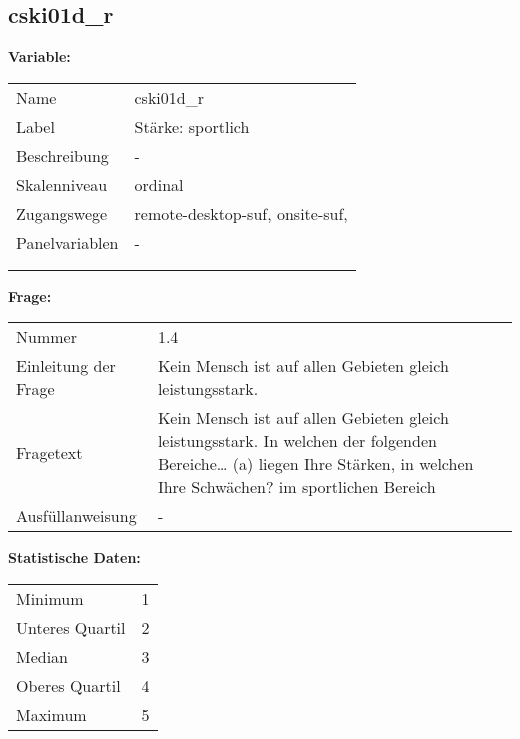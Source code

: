 	
	
	\subsection{cski01d\_r}
	\label{subSection:cski01d_r}

	\noindent\textbf{Variable:}\\
		\begin{tabular}{lL{11.3cm}}
			\label{tableVariable:cski01d_r}
			Name & cski01d\_r \\
			Label & Stärke: sportlich \\
			Beschreibung & - \\
			Skalenniveau & ordinal \\
			Zugangswege &
				remote-desktop-suf,
				onsite-suf,
 \\
			Panelvariablen & -
			 \\
			 \\
 \\
		\end{tabular}

		\vspace*{1 cm}
		\noindent\textbf{Frage:}\\
		\begin{tabular}{lL{11.3cm}}
			\label{tableQuestion:cski01d_r}
			Nummer & 1.4 \\
			Einleitung der Frage & Kein Mensch ist auf allen Gebieten gleich leistungsstark. \\
			Fragetext & Kein Mensch ist auf allen Gebieten gleich leistungsstark. In welchen der folgenden Bereiche…
(a) liegen Ihre Stärken, in welchen Ihre Schwächen?
im sportlichen Bereich \\
			Ausfüllanweisung & - \\
		\end{tabular}


		\vspace*{1 cm}
		\noindent\textbf{Statistische Daten:}\\
			\begin{tabular}{ll}
				\label{tableStatistics:cski01d_r}
					Minimum & 1 \\
					Unteres Quartil & 2 \\
					Median & 3 \\
					Oberes Quartil & 4 \\
					Maximum & 5 \\
			\end{tabular}




